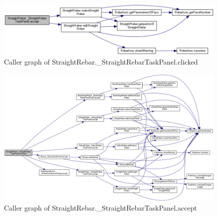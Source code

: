 \begin{figure}
\centering
\includegraphics[width=1\linewidth]{images/taskpanelaccept.png}
\caption{Caller graph of StraightRebar.\_StraightRebarTaskPanel.clicked}
\label{fig:comment}
\end{figure}
\begin{figure}
\centering
\includegraphics[width=1\linewidth,height=1\columnwidth]{images/taskpaneldetail.png}
\caption{Caller graph of StraightRebar.\_StraightRebarTaskPanel.accept}
\label{fig:dependency}
\end{figure}



